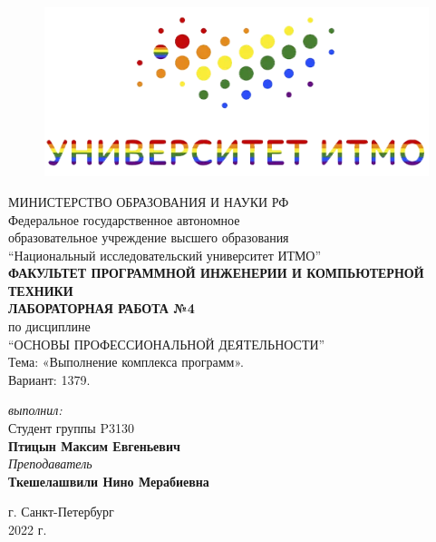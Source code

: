 \begin{center}

	\begin{figure}[H]
	\centering
	\includegraphics[scale=0.7]{img/ITMO_LGBT}
	\end{figure}
	\hfill \break
	МИНИСТЕРСТВО ОБРАЗОВАНИЯ И НАУКИ РФ\\
	\hfill \break
	Федеральное государственное автономное\\
	образовательное учреждение высшего образования\\
	``Национальный исследовательский университет ИТМО''\\
	\hfill \break
	\textbf{ФАКУЛЬТЕТ ПРОГРАММНОЙ ИНЖЕНЕРИИ И КОМПЬЮТЕРНОЙ ТЕХНИКИ}\\
	\vspace{3cm}
	\large{\textbf{ЛАБОРАТОРНАЯ РАБОТА №4}}\\
	\hfill \break
	по дисциплине\\
	\large{``ОСНОВЫ ПРОФЕССИОНАЛЬНОЙ ДЕЯТЕЛЬНОСТИ''}\\
	Тема: «Выполнение комплекса программ».\\
	\hfill \break
	Вариант: 1379.
	\vspace{5cm}
	\begin{flushright}
	\textit{выполнил:}\\
	Студент группы P3130\\
	\textbf{Птицын Максим Евгеньевич}\\
	\textit{Преподаватель}\\
	\textbf{Ткешелашвили Нино Мерабиевна}
	\end{flushright}
\end{center}

\vfill


\begin{center} г. Санкт-Петербург\\2022 г.
\end{center}

\thispagestyle{empty}
\newpage